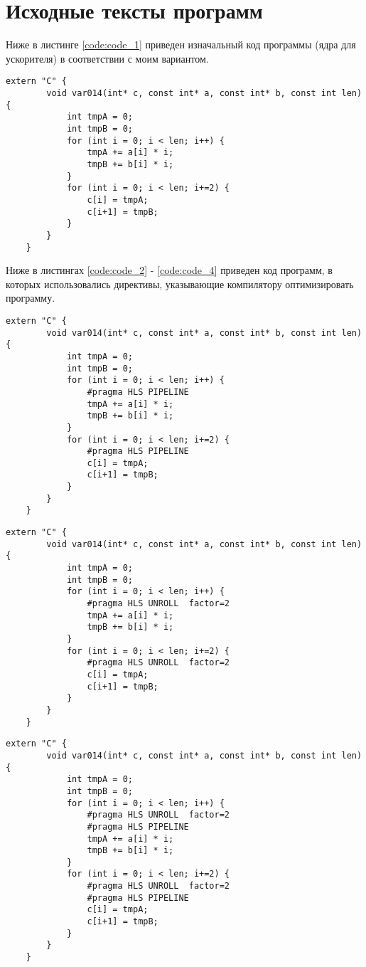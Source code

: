 \setcounter{chapter}{1}

\section{Исходные тексты программ}

Ниже в листинге \ref{code:code_1} приведен изначальный код программы (ядра для ускорителя) в соответствии с моим вариантом.

\begin{lstlisting}[label=code:code_1, caption=Код исходной программы]
	extern "C" {
		void var014(int* c, const int* a, const int* b, const int len) {
			int tmpA = 0;
			int tmpB = 0;
			for (int i = 0; i < len; i++) {
				tmpA += a[i] * i;
				tmpB += b[i] * i;
			}
			for (int i = 0; i < len; i+=2) {
				c[i] = tmpA;
				c[i+1] = tmpB;
			}
		}
	}
\end{lstlisting}

Ниже в листингах \ref{code:code_2} - \ref{code:code_4} приведен код программ, в которых использовались директивы, указывающие компилятору оптимизировать программу.

\begin{lstlisting}[label=code:code_2, caption=Конвейерное исполнение]
	extern "C" {
		void var014(int* c, const int* a, const int* b, const int len) {
			int tmpA = 0;
			int tmpB = 0;
			for (int i = 0; i < len; i++) {
				#pragma HLS PIPELINE
				tmpA += a[i] * i;
				tmpB += b[i] * i;
			}
			for (int i = 0; i < len; i+=2) {
				#pragma HLS PIPELINE
				c[i] = tmpA;
				c[i+1] = tmpB;
			}
		}
	}
\end{lstlisting}


\newpage
\begin{lstlisting}[label=code:code_3, caption=Развернутый цикл]
	extern "C" {
		void var014(int* c, const int* a, const int* b, const int len) {
			int tmpA = 0;
			int tmpB = 0;
			for (int i = 0; i < len; i++) {
				#pragma HLS UNROLL  factor=2
				tmpA += a[i] * i;
				tmpB += b[i] * i;
			}
			for (int i = 0; i < len; i+=2) {
				#pragma HLS UNROLL  factor=2
				c[i] = tmpA;
				c[i+1] = tmpB;
			}
		}
	}
\end{lstlisting}


\begin{lstlisting}[label=code:code_4, caption=Развернутый цикл и конвейерное исполнение]
	extern "C" {
		void var014(int* c, const int* a, const int* b, const int len) {
			int tmpA = 0;
			int tmpB = 0;
			for (int i = 0; i < len; i++) {
				#pragma HLS UNROLL  factor=2
				#pragma HLS PIPELINE
				tmpA += a[i] * i;
				tmpB += b[i] * i;
			}
			for (int i = 0; i < len; i+=2) {
				#pragma HLS UNROLL  factor=2
				#pragma HLS PIPELINE
				c[i] = tmpA;
				c[i+1] = tmpB;
			}
		}
	}
\end{lstlisting}

